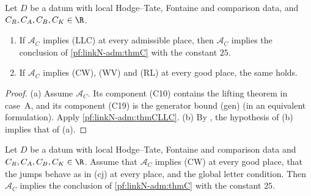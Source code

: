 \begin{proposition}\label{pf:linkN-adm:thmC3}
Let $D$ be a datum with local Hodge--Tate, Fontaine and comparison data, and $C_R,C_A,C_B,C_K\in\R$.
\begin{enumerate}[label=(\alph*)]
\item If $\mathcal A_C$ implies (LLC) at every admissible place, then $\mathcal A_C$ implies the conclusion of
  \cref{pf:linkN-adm:thmC} with the constant $25$.
\item If $\mathcal A_C$ implies (CW), (WV) and (RL) at every good place, the same holds.
\end{enumerate}
\end{proposition}

\begin{proof}
(a) Assume $\mathcal A_C$. Its component (C10) contains the lifting theorem in case~A, and its component (C19) is the
generator bound (gen) (in an equivalent formulation). Apply \cref{pf:linkN-adm:thmCLLC}. (b) By
, the hypothesis of (b) implies that
of (a).
\end{proof}

\begin{proposition}\label{pf:linkN-adm:TLL}
Let $D$ be a datum with local Hodge--Tate, Fontaine and comparison data and $C_R,C_A,C_B,C_K\in\R$. Assume that $\mathcal
A_C$ implies (CW) at every good place, that the jumps behave as in (cj) at every place, and the global letter condition.
Then $\mathcal A_C$ implies the conclusion of \cref{pf:linkN-adm:thmC} with the constant $25$.
\end{proposition}

